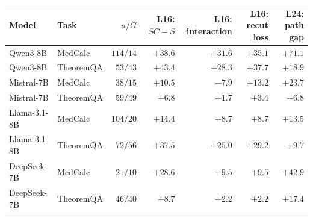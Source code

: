 \begin{tabular*}{\textwidth}{@{\extracolsep{\fill}}llrrrrr@{}}
\toprule
Model & Task & $n/G$ & L16: $SC-S$ & L16: interaction & L16: recut loss & L24: path gap \\
\midrule
Qwen3-8B & MedCalc & $114/14$ & $+38.6$ & $+31.6$ & $+35.1$ & $+71.1$ \\
Qwen3-8B & TheoremQA & $53/43$ & $+43.4$ & $+28.3$ & $+37.7$ & $+18.9$ \\
Mistral-7B & MedCalc & $38/15$ & $+10.5$ & $-7.9$ & $+13.2$ & $+23.7$ \\
Mistral-7B & TheoremQA & $59/49$ & $+6.8$ & $+1.7$ & $+3.4$ & $+6.8$ \\
Llama-3.1-8B & MedCalc & $104/20$ & $+14.4$ & $+8.7$ & $+8.7$ & $+13.5$ \\
Llama-3.1-8B & TheoremQA & $72/56$ & $+37.5$ & $+25.0$ & $+29.2$ & $+9.7$ \\
DeepSeek-7B & MedCalc & $21/10$ & $+28.6$ & $+9.5$ & $+9.5$ & $+42.9$ \\
DeepSeek-7B & TheoremQA & $46/40$ & $+8.7$ & $+2.2$ & $+2.2$ & $+17.4$ \\
\bottomrule
\end{tabular*}
